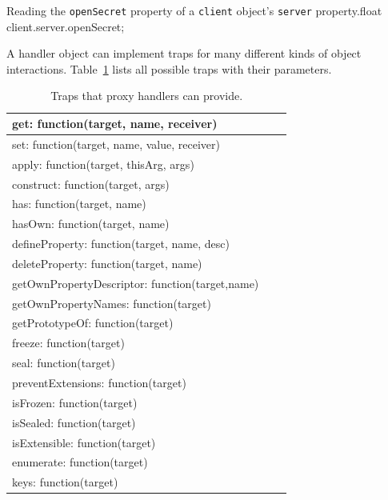 \begin{code}{Reading the \lstinline{openSecret} property of a \lstinline{client} object's \lstinline{server} property.}{float}
client.server.openSecret;
\end{code}
\iffalse
\end{verbatim}\fi

A handler object can implement traps for many different kinds of object interactions.
Table~\ref{table:traps} lists all possible traps with their parameters.

\begin{table}[h]
\begin{center}
\begin{tabular}{|l|l|r|}
\hline
get: function(target, name, receiver) \\ \hline
set: function(target, name, value, receiver) \\ \hline
apply: function(target, thisArg, args) \\ \hline
construct: function(target, args) \\ \hline
has: function(target, name) \\ \hline
hasOwn: function(target, name) \\ \hline
defineProperty: function(target, name, desc) \\ \hline
deleteProperty: function(target, name) \\ \hline
getOwnPropertyDescriptor: function(target,name) \\ \hline
getOwnPropertyNames: function(target) \\ \hline
getPrototypeOf: function(target) \\ \hline
freeze: function(target) \\ \hline
seal: function(target) \\ \hline
preventExtensions: function(target) \\ \hline
isFrozen: function(target) \\ \hline
isSealed: function(target) \\ \hline
isExtensible: function(target) \\ \hline
enumerate: function(target) \\ \hline
keys: function(target) \\ \hline
\end{tabular}
\caption[Table caption text]{Traps that proxy handlers can provide.}
\label{table:traps}
\end{center}
\end{table}

